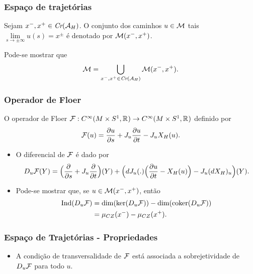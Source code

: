 \documentclass{beamer}
\begin{document}
\begin{footnotesize}
	\begin{frame}
	\frametitle{Espaço de trajetórias}		
	Sejam $x^{-}, x^{+}\in \textit{Cr}(\mathcal{A}_{H})$. O conjunto dos caminhos $u \in \mathcal{M}$ tais $\lim\limits_{s\to \pm \infty}u(s) = x^{\pm}$ é denotado por $\mathcal{M}(x^{-}, x^{+})$.
			
			\begin{observacao}\label{observacao_uniao_orbitas_conectantes}
				Pode-se mostrar que 
				$$
				\mathcal{M} = \bigcup_{x^{-}, x^{+} \in \textit{Cr}(\mathcal{A}_{H})} \mathcal{M}(x^{-}, x^{+}).
				$$
			\end{observacao}
			
	\end{frame}
	
	\begin{frame}
		\frametitle{Operador de Floer}
		\begin{definition}
			O operador de Floer $\mathcal{F}:C^{\infty}(M\times S^{1}, \mathbb{R}^{})\to C^{\infty}(M\times S^{1}, \mathbb{R}^{})$ definido por 
			$$
			\mathcal{F}(u)=\frac{\partial u}{\partial s} + J_{u}\frac{\partial u}{\partial t} - J_{u}X_{H}(u).
			$$
		\end{definition}
		\begin{itemize}
			
		
			\item O diferencial de $\mathcal{F}$ é dado por 
			$$
			D_{u}\mathcal{F}(Y)= \Big( \frac{\partial }{\partial s} + J_{u}\frac{\partial }{\partial t}\Big)(Y)+ \Big(dJ_{u}(.)\Big( \frac{\partial u}{\partial t} - X_{H}(u) \Big) - J_{u} (dX_{H})_{u}\Big)(Y).
			$$
			
			\item Pode-se mostrar que, se $u\in \mathcal{M}(x^{-}, x^{+})$, então
			$$
			\begin{aligned}
				\text{Ind}{(D_{u}\mathcal{F})} &= \dim(\ker(D_{u}\mathcal{F})) -\dim(\text{coker}(D_{u}\mathcal{F}))
				\\
				&= \mu_{CZ}(x^{-})-\mu_{CZ}(x^{+}).
			\end{aligned}
			$$
			
		\end{itemize}
	\end{frame}
	
	\begin{frame}
		\frametitle{Espaço de Trajetórias - Propriedades}
		\begin{itemize}
			\item A condição de transversalidade de $\mathcal{F}$ está associada a sobrejetividade de $D_{u}\mathcal{F}$ para todo $u$.
			

\end{itemize}
\end{frame}
\end{footnotesize}
\end{document}
